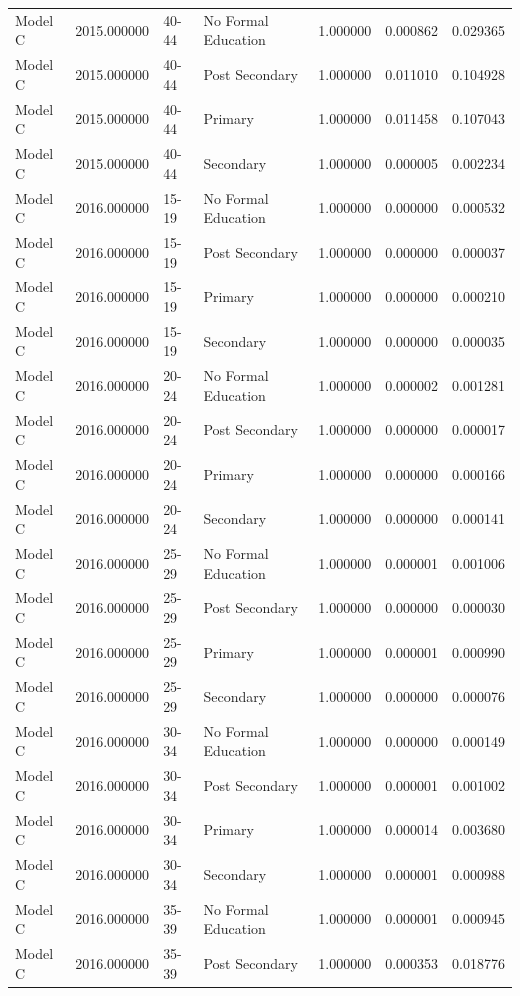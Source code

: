 \begin{table}[ht]
\begin{tabular}{lrllrrr}
Model C & 2015.000000 & 40-44 & No Formal Education & 1.000000 & 0.000862 & 0.029365 \\
Model C & 2015.000000 & 40-44 & Post Secondary & 1.000000 & 0.011010 & 0.104928 \\
Model C & 2015.000000 & 40-44 & Primary & 1.000000 & 0.011458 & 0.107043 \\
Model C & 2015.000000 & 40-44 & Secondary & 1.000000 & 0.000005 & 0.002234 \\
Model C & 2016.000000 & 15-19 & No Formal Education & 1.000000 & 0.000000 & 0.000532 \\
Model C & 2016.000000 & 15-19 & Post Secondary & 1.000000 & 0.000000 & 0.000037 \\
Model C & 2016.000000 & 15-19 & Primary & 1.000000 & 0.000000 & 0.000210 \\
Model C & 2016.000000 & 15-19 & Secondary & 1.000000 & 0.000000 & 0.000035 \\
Model C & 2016.000000 & 20-24 & No Formal Education & 1.000000 & 0.000002 & 0.001281 \\
Model C & 2016.000000 & 20-24 & Post Secondary & 1.000000 & 0.000000 & 0.000017 \\
Model C & 2016.000000 & 20-24 & Primary & 1.000000 & 0.000000 & 0.000166 \\
Model C & 2016.000000 & 20-24 & Secondary & 1.000000 & 0.000000 & 0.000141 \\
Model C & 2016.000000 & 25-29 & No Formal Education & 1.000000 & 0.000001 & 0.001006 \\
Model C & 2016.000000 & 25-29 & Post Secondary & 1.000000 & 0.000000 & 0.000030 \\
Model C & 2016.000000 & 25-29 & Primary & 1.000000 & 0.000001 & 0.000990 \\
Model C & 2016.000000 & 25-29 & Secondary & 1.000000 & 0.000000 & 0.000076 \\
Model C & 2016.000000 & 30-34 & No Formal Education & 1.000000 & 0.000000 & 0.000149 \\
Model C & 2016.000000 & 30-34 & Post Secondary & 1.000000 & 0.000001 & 0.001002 \\
Model C & 2016.000000 & 30-34 & Primary & 1.000000 & 0.000014 & 0.003680 \\
Model C & 2016.000000 & 30-34 & Secondary & 1.000000 & 0.000001 & 0.000988 \\
Model C & 2016.000000 & 35-39 & No Formal Education & 1.000000 & 0.000001 & 0.000945 \\
Model C & 2016.000000 & 35-39 & Post Secondary & 1.000000 & 0.000353 & 0.018776 \\

\end{tabular}
\end{table}
